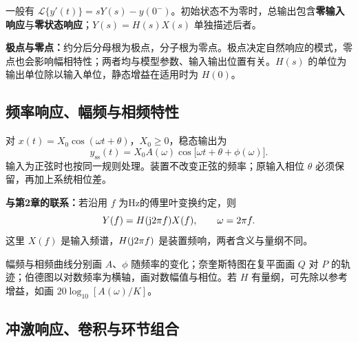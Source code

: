 一般有 $\mathcal L\{y'(t)\}=sY(s)-y(0^-)$。初始状态不为零时，总输出包含\textbf{零输入响应}与\textbf{零状态响应}；$Y(s)=H(s)X(s)$ 单独描述后者。

\textbf{极点与零点：}约分后分母根为极点，分子根为零点。极点决定自然响应的模式，零点也会影响幅相特性；两者均与模型参数、输入输出位置有关。$H(s)$ 的单位为输出单位除以输入单位，静态增益在适用时为 $H(0)$。


\subsection{频率响应、幅频与相频特性}


对 $x(t)=X_0\cos(\omega t+\theta)$，$X_0\geq0$，稳态输出为
\[
\boxed{y_{\mathrm{ss}}(t)=X_0A(\omega)
\cos\bigl[\omega t+\theta+\phi(\omega)\bigr]}.
\]
输入为正弦时也按同一规则处理。装置不改变正弦的频率；原输入相位 $\theta$ 必须保留，再加上系统相位差。

\textbf{与第2章的联系：}若沿用 $f$ 为Hz的傅里叶变换约定，则
\[
Y(f)=H(\mathrm{j}2\pi f)X(f),\qquad \omega=2\pi f.
\]
这里 $X(f)$ 是输入频谱，$H(\mathrm{j}2\pi f)$ 是装置频响，两者含义与量纲不同。

幅频与相频曲线分别画 $A$、$\phi$ 随频率的变化；奈奎斯特图在复平面画 $Q$ 对 $P$ 的轨迹；伯德图以对数频率为横轴，画对数幅值与相位。若 $H$ 有量纲，可先除以参考增益，如画 $20\log_{10}[A(\omega)/K]$。

\subsection{冲激响应、卷积与环节组合}


